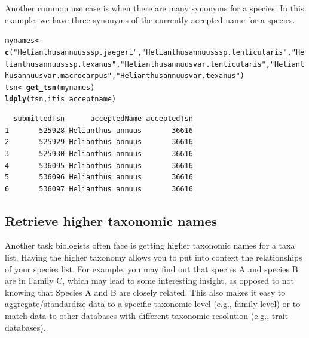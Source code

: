 \documentclass[10pt,a4paper,twocolumn]{article}
\makeatletter
\newcommand{\hlfunctioncall}[1]{\textcolor[rgb]{0.501960784313725,0,0.329411764705882}{\textbf{#1}}}%
\newcommand{\hlstring}[1]{\textcolor[rgb]{0.6,0.6,1}{#1}}%
\newenvironment{kframe}{%
 \def\at@end@of@kframe{}%
 \ifinner\ifhmode%
  \def\at@end@of@kframe{\end{minipage}}%
  \begin{minipage}{\columnwidth}%
 \fi\fi%
 \def\FrameCommand##1{\hskip\@totalleftmargin \hskip-\fboxsep
 \colorbox{shadecolor}{##1}\hskip-\fboxsep
     \hskip-\linewidth \hskip-\@totalleftmargin \hskip\columnwidth}%
 \MakeFramed {\advance\hsize-\width
   \@totalleftmargin\z@ \linewidth\hsize
   \@setminipage}}%
 {\par\unskip\endMakeFramed%
 \at@end@of@kframe}
\newenvironment{knitrout}{}{} %
\makeatother
\begin{document}
Another common use case is when there are many synonyms for a species. In this example, we have three synonyms of the currently accepted name for a species. 

\begin{knitrout}
\begin{scriptsize}
\color{fgcolor}\begin{kframe}
\begin{alltt}
mynames <- \hlfunctioncall{c}(\hlstring{"Helianthus annuus ssp. jaegeri"}, \newline \hlstring{"Helianthus annuus ssp. lenticularis"}, \newline \hlstring{"Helianthus annuus ssp. texanus"}, \newline \hlstring{"Helianthus annuus var. lenticularis"}, \newline \hlstring{"Helianthus annuus var. macrocarpus"}, \newline \hlstring{"Helianthus annuus var. texanus"})
tsn <- \hlfunctioncall{get_tsn}(mynames)
\hlfunctioncall{ldply}(tsn, itis_acceptname)
\end{alltt}
\begin{verbatim}
  submittedTsn      acceptedName acceptedTsn
1       525928 Helianthus annuus       36616
2       525929 Helianthus annuus       36616
3       525930 Helianthus annuus       36616
4       536095 Helianthus annuus       36616
5       536096 Helianthus annuus       36616
6       536097 Helianthus annuus       36616
\end{verbatim}
\end{kframe}
\end{scriptsize}
\end{knitrout}


\subsection*{Retrieve higher taxonomic names}
Another task biologists often face is getting higher taxonomic names for a taxa list. Having the higher taxonomy allows you to put into context the relationships of your species list. For example, you may find out that species A and species B are in Family C, which may lead to some interesting insight, as opposed to not knowing that Species A and B are closely related. This also makes it easy to aggregate/standardize data to a specific taxonomic level (e.g., family level) or to match data to other databases with different taxonomic resolution (e.g., trait databases).
\end{document}

